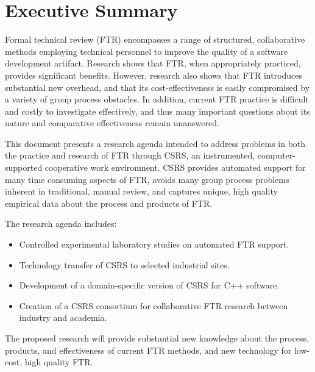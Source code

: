 
\section{Executive Summary}

Formal technical review (FTR) encompasses a range of structured,
collaborative methods employing technical personnel to improve the quality
of a software development artifact.  Research shows that FTR, when
appropriately practiced, provides significant benefits. However, research
also shows that FTR introduces substantial new overhead, and that its
cost-effectiveness is easily compromised by a variety of group process
obstacles.  In addition, current FTR practice is difficult and costly to
investigate effectively, and thus many important questions about its nature
and comparative effectiveness remain unanswered.

This document presents a research agenda intended to address problems in
both the practice and research of FTR through CSRS, an instrumented, computer-supported cooperative
work environment. CSRS provides automated support for many time consuming
aspects of FTR, avoids many group process problems inherent in traditional,
manual review, and captures unique, high quality empirical data about the
process and products of FTR.

The research agenda includes:
\begin{itemize}
\item Controlled experimental laboratory studies on automated FTR support.
\item Technology transfer of CSRS to selected industrial sites.
\item Development of a domain-specific version of CSRS for C++ software.
\item Creation of a CSRS consortium for collaborative FTR research between
  industry and academia.
\end{itemize}

The proposed research will provide substantial new knowledge about the
process, products, and effectiveness of current FTR methods, and new
technology for low-cost, high quality FTR.




